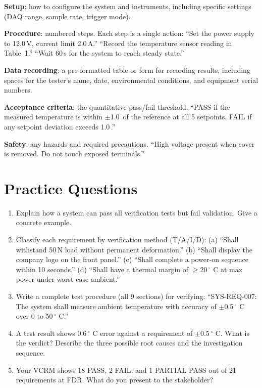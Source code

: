 \textbf{Setup}: how to configure the system and instruments, including specific settings (DAQ range, sample rate, trigger mode).

\textbf{Procedure}: numbered steps. Each step is a single action: ``Set the power supply to 12.0\,V, current limit 2.0\,A.'' ``Record the temperature sensor reading in Table~1.'' ``Wait 60\,s for the system to reach steady state.''

\textbf{Data recording}: a pre-formatted table or form for recording results, including spaces for the tester's name, date, environmental conditions, and equipment serial numbers.

\textbf{Acceptance criteria}: the quantitative pass/fail threshold. ``PASS if the measured temperature is within $\pm$1.0\,\degC{} of the reference at all 5 setpoints. FAIL if any setpoint deviation exceeds 1.0\,\degC{}.''

\textbf{Safety}: any hazards and required precautions. ``High voltage present when cover is removed. Do not touch exposed terminals.''

\section{Practice Questions}
\begin{enumerate}[leftmargin=1.5em]
\item Explain how a system can pass all verification tests but fail validation. Give a concrete example.
\item Classify each requirement by verification method (T/A/I/D): (a) ``Shall withstand 50\,N load without permanent deformation.'' (b) ``Shall display the company logo on the front panel.'' (c) ``Shall complete a power-on sequence within 10 seconds.'' (d) ``Shall have a thermal margin of $\geq$20\,$^{\circ}$ C at max power under worst-case ambient.''
\item Write a complete test procedure (all 9 sections) for verifying: ``SYS-REQ-007: The system shall measure ambient temperature with accuracy of $\pm$0.5\,$^{\circ}$ C over 0 to 50\,$^{\circ}$ C.''
\item A test result shows 0.6\,$^{\circ}$ C error against a requirement of $\pm$0.5\,$^{\circ}$ C. What is the verdict? Describe the three possible root causes and the investigation sequence.
\item Your VCRM shows 18 PASS, 2 FAIL, and 1 PARTIAL PASS out of 21 requirements at FDR. What do you present to the stakeholder?
\end{enumerate}

